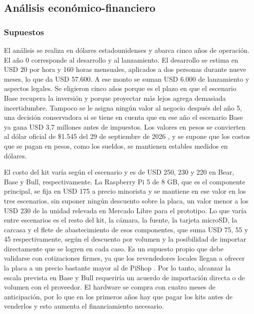 \subsection{Análisis económico-financiero}
\label{sec:analisis-financiero}

\subsubsection{Supuestos}
\label{sec:supuestos}

El análisis se realiza en dólares estadounidenses y abarca cinco años de operación.
El año 0 corresponde al desarrollo y al lanzamiento.
El desarrollo se estima en USD 20 por hora y 160 horas mensuales, aplicados a dos personas durante nueve meses, lo que da USD 57.600.
A ese monto se suman USD 6.000 de lanzamiento y aspectos legales.
Se eligieron cinco años porque es el plazo en que el escenario Base recupera la inversión y porque proyectar más lejos agrega demasiada incertidumbre.
Tampoco se le asigna ningún valor al negocio después del año 5, una decisión conservadora si se tiene en cuenta que en ese año el escenario Base ya gana USD 3,7 millones antes de impuestos.
Los valores en pesos se convierten al dólar oficial de \$1.545 del 29 de septiembre de 2026 \parencite{DolarAPI2026}, y se supone que los costos que se pagan en pesos, como los sueldos, se mantienen estables medidos en dólares.

El costo del kit varía según el escenario y es de USD 250, 230 y 220 en Bear, Base y Bull, respectivamente.
La Raspberry Pi 5 de 8 GB, que es el componente principal, se fija en USD 175 a precio minorista \parencite{PiShop2026} y se mantiene en ese valor en los tres escenarios, sin suponer ningún descuento sobre la placa, un valor menor a los USD 230 de la unidad relevada en Mercado Libre para el prototipo.
Lo que varía entre escenarios es el resto del kit, la cámara, la fuente, la tarjeta microSD, la carcasa y el flete de abastecimiento de esos componentes, que suma USD 75, 55 y 45 respectivamente, según el descuento por volumen y la posibilidad de importar directamente que se logren en cada caso.
Es un supuesto propio que debe validarse con cotizaciones firmes, ya que los revendedores locales llegan a ofrecer la placa a un precio bastante mayor al de PiShop \parencite{Siranet2026}.
Por lo tanto, alcanzar la escala prevista en Base y Bull requeriría un acuerdo de importación directa o de volumen con el proveedor.
El hardware se compra con cuatro meses de anticipación, por lo que en los primeros años hay que pagar los kits antes de venderlos y esto aumenta el financiamiento necesario.

